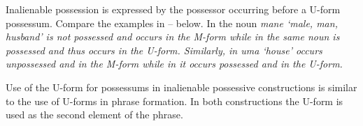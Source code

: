 \begin{exe}\let\eachwordone=\textit
	\label{ex:MamAliPos1}
	\label{ex:MamAliPos2}
\end{exe}

Inalienable possession is expressed
by the possessor occurring before a U-form possessum.
Compare the examples in -- below.
In  the noun \it{mane} `male, man, husband'
is not possessed and occurs in the M-form while
in  the same noun is possessed and
thus occurs in the U-form.
Similarly, in  \it{uma} `house'
occurs unpossessed and in the M-form
while in  it occurs possessed and in the U-form.

\begin{exe}\let\eachwordone=\textit
	\label{ex:MamPos1a}
	\label{ex:MamPos1b}
	\label{ex:MamPos2a}
	\label{ex:MamPos2b}
\end{exe}

Use of the U-form for possessums in inalienable
possessive constructions is similar
to the use of U-forms in phrase formation.
In both constructions the U-form is used as the second element of the phrase.

